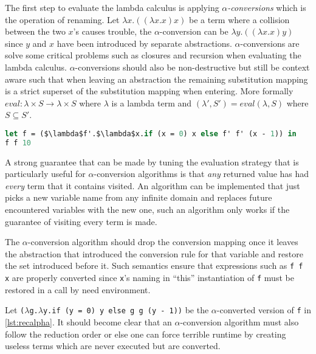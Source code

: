 \documentclass[11pt,oneside,a4paper]{report}
\begin{document}
The first step to evaluate the lambda calculus is applying \textit{$\alpha$-conversions} which is the operation of renaming.
Let $\lambda x . ((\lambda x . x) x)$ be a term where a collision between the two $x$'s causes trouble, the $\alpha$-conversion can be $\lambda y . ((\lambda x . x) y)$ since $y$ and $x$ have been introduced by separate abstractions.
$\alpha$-conversions are solve some critical problems such as closures and recursion when evaluating the lambda calculus.
$\alpha$-conversions should also be non-destructive but still be context aware such that when leaving an abstraction the remaining substitution mapping is a strict superset of the substitution mapping when entering.
More formally $\textit{eval}: \lambda \times S \rightarrow \lambda \times S$ where $\lambda$ is a lambda term and $(\lambda',S') = eval(\lambda, S)$ where $S \subseteq S'$.
\begin{lstlisting}[language=ML,caption={Recursive addition function},label={lst:recalpha},mathescape=true]
let f = ($\lambda$f'.$\lambda$x.if (x = 0) x else f' f' (x - 1)) in
f f 10
\end{lstlisting}
A strong guarantee that can be made by tuning the evaluation strategy that is particularly useful for $\alpha$-conversion algorithms is that \textit{any} returned value has had \textit{every} term that it contains visited.
An algorithm can be implemented that just picks a new variable name from any infinite domain and replaces future encountered variables with the new one, such an algorithm only works if the guarantee of visiting every term is made.
\begin{remark}
The $\alpha$-conversion algorithm should drop the conversion mapping once it leaves the abstraction that introduced the conversion rule for that variable and restore the set introduced before it.
Such semantics ensure that expressions such as \texttt{f f x} are properly converted since \texttt{x}'s naming in ``this'' instantiation of \texttt{f} must be restored in a call by need environment.
\end{remark}
Let \texttt{($\lambda$g.$\lambda$y.if (y = 0) y else g g (y - 1))} be the $\alpha$-converted version of \texttt{f} in \autoref{lst:recalpha}.
It should become clear that an $\alpha$-conversion algorithm must also follow the reduction order or else one can force terrible runtime by creating useless terms which are never executed but are converted.
\end{document}
